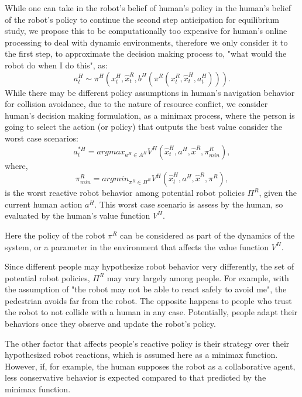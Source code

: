 \documentclass{article}
\begin{document}
While one can take in the robot's belief of human's policy in the human's belief of the robot's policy to continue the second step anticipation for equilibrium study, we propose this to be computationally too expensive for human's online processing to deal with dynamic environments, therefore we only consider it to the first step, to approximate the decision making process to, "what would the robot do when I do this", as:
\begin{equation}
a^H_t \sim \pi^H (x^H_t, \hat{x}^R_t, b^H(\pi^R (x^R_t, \hat{x}^H_t,a^H_t ))).
\end{equation}
While there may be different policy assumptions in human's navigation behavior for collision avoidance, due to the nature of resource conflict, we consider human's decision making formulation, as a minimax process, where the person is going to select the action (or policy) that outputs the best value consider the worst case scenarios:
\begin{equation}
a^{*H}_t = argmax_{a^H \in A^H} V^H(\hat{x}^H_t, a^H ,\hat{x}^R,\pi^R_{min}),
\end{equation}
where,
\begin{equation}
    \pi^R_{min} = argmin_{\pi^R \in \Pi^R} V^H(\hat{x}^H_t,a^H, \hat{x}^R, \pi^R),
\end{equation}
is the worst reactive robot behavior among potential robot policies $\Pi^R$, given the current human action $a^H$. This worst case scenario is assess by the human, so evaluated by the human's value function $V^H$. 

Here the policy of the robot $\pi^R$ can be considered as part of the dynamics of the system, or a parameter in the environment that affects the value function $V^H$. 

Since different people may hypothesize robot behavior very differently, the set of potential robot policies, $\Pi^R$ may vary largely among people. For example, with the assumption of "the robot may not be able to react safely to avoid me", the pedestrian avoids far from the robot. The opposite happens to people who trust the robot to not collide with a human in any case. Potentially, people adapt their behaviors once they observe and update the robot's policy. 

The other factor that affects people's reactive policy is their strategy over their hypothesized robot reactions, which is assumed here as a minimax function. However, if, for example, the human supposes the robot as a collaborative agent, less conservative behavior is expected compared to that predicted by the minimax function.
\end{document}
